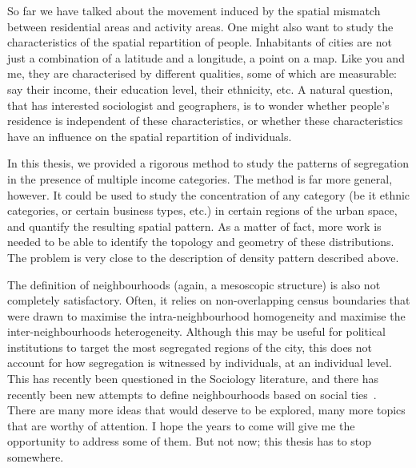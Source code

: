 So far we have talked about the movement induced by the spatial mismatch between
residential areas and activity areas. One might also want to study the
characteristics of the spatial repartition of people. Inhabitants of cities are
not just a combination of a latitude and a longitude, a point on a map. Like you
and me, they are characterised by different qualities, some of which are
measurable: say their income, their education level, their ethnicity, etc. A
natural question, that has interested sociologist and geographers, is to wonder
whether people's residence is independent of these characteristics, or whether
these characteristics have an influence on the spatial repartition of
individuals.  

In this thesis, we provided a rigorous method to study the patterns of
segregation in the presence of multiple income categories. The method is far
more general, however. It could be used to study the concentration of any
category (be it ethnic categories, or certain business types, etc.)
in certain regions of the urban space, and quantify the resulting spatial pattern. As a
matter of fact, more work is needed to be able to identify the topology and
geometry of these distributions. The problem is very close to the description of
density pattern described above.

The definition of neighbourhoods (again, a mesoscopic structure) is also not
completely satisfactory. Often, it relies on non-overlapping census boundaries
that were drawn to maximise the intra-neighbourhood homogeneity and maximise the
inter-neighbourhoods heterogeneity. Although this may be useful for political
institutions to target the most segregated regions of the city, this does not
account for how segregation is witnessed by individuals, at an individual level.
This has recently been questioned in the Sociology literature, and there has
recently been new attempts to define neighbourhoods based on social ties~\cite{Hipp:2012}.\\

There are many more ideas that would deserve to be explored, many more topics
that are worthy of attention. I hope the years to come will give me the opportunity
to address some of them. But not now; this thesis has to stop somewhere.  
